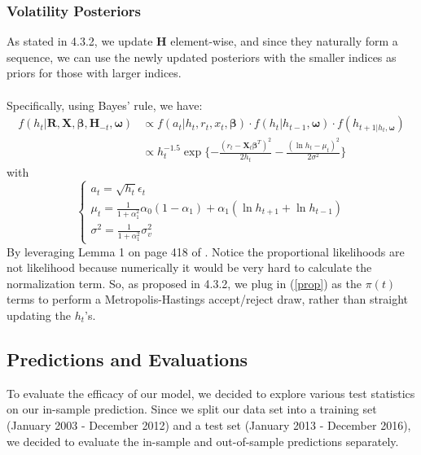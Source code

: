 \documentclass[letterpaper]{article}
\newcommand{\XX}{\mathbf{X}}
\begin{document}
	\subsubsection{Volatility Posteriors}
	As stated in 4.3.2, we update $\bm{H}$ element-wise, and since they naturally form a sequence, we can use the newly updated posteriors with the smaller indices as priors for those with larger indices.\\\\
	Specifically, using Bayes' rule, we have:
	\begin{equation}\label{prop}
		\begin{split}
			f(h_t|\bm{R},\bm{X},\bm{\beta},\bm{H}_{-t},\bm{\omega})
			&\propto f(a_t|h_t,r_t,x_t,\bm{\beta})\cdot f(h_t|h_{t-1},\bm{\omega})\cdot f(h_{t+1|h_t,\bm{\omega}})\\
			&\propto h_t^{-1.5}\exp\{-\frac{(r_t-\XX_t\bm{\beta}^T)^2}{2h_t}-\frac{(\ln h_t-\mu_t)^2}{2\sigma^2}\}
		\end{split}
	\end{equation}
	with
	\begin{equation}
		\begin{cases}
        a_t=\sqrt{h_t}\epsilon_t\\
		\mu_t=\frac{1}{1+\alpha_{1}^2}\alpha_{0}(1-\alpha_{1})+\alpha_{1}(\ln h_{t+1}+\ln h_{t-1})\\
		\sigma^2=\frac{1}{1+\alpha_{1}^2}\sigma_{v}^2
		\end{cases}
	\end{equation}
	By leveraging Lemma 1 on page 418 of \cite{tiao1973post}. Notice the proportional likelihoods are not likelihood because numerically it would be very hard to calculate the normalization term. So, as proposed in 4.3.2, we plug in (\ref{prop}) as the $\pi(t)$ terms to perform a Metropolis-Hastings accept/reject draw, rather than straight updating the $h_t$'s.
    \subsection{Predictions and Evaluations}
To evaluate the efficacy of our model, we decided to explore various test statistics on our in-sample prediction. Since we split our data set into a training set (January 2003 - December 2012) and a test set (January 2013 - December 2016), we decided to evaluate the in-sample and out-of-sample predictions separately.
\end{document}
